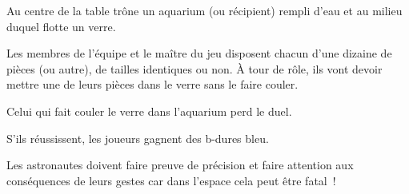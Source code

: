 \documentclass{grand-jeu}
\begin{document}
\begin{liste-materiel}
\end{liste-materiel}

\begin{regles}
Au centre de la table trône un aquarium (ou récipient) rempli d'eau et au milieu duquel flotte un verre.

Les membres de l'équipe et le maître du jeu disposent chacun d'une dizaine de pièces (ou autre), de tailles identiques ou non. À tour de rôle, ils vont devoir mettre une de leurs pièces dans le verre sans le faire couler. 

Celui qui fait couler le verre dans l'aquarium perd le duel.

S’ils réussissent, les joueurs gagnent des b-dures bleu. 
\end{regles}

\begin{imaginaire}
Les astronautes doivent faire preuve de précision et faire attention aux conséquences de leurs gestes car dans l'espace cela peut être fatal ! 
\end{imaginaire}

\begin{moments-stop}
\end{moments-stop}
\end{document}
